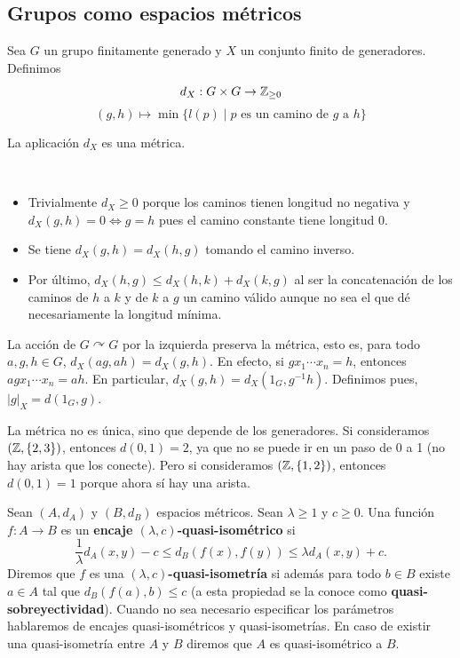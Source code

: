 \documentclass[twoside, 11pt]{article}
\begin{document}
\subsection{Grupos como espacios métricos}

Sea $G$ un grupo finitamente generado y $X$ un conjunto finito de generadores. Definimos
\[
d_X:G\times G\to\mathbb{Z}_{\geq 0}
\]
\[
(g,h)\mapsto\min\{l(p)\mid p\text{ es un camino de }g\text{ a }h\}
\]
\begin{prop}
La aplicación $d_X$ es una métrica.
\end{prop}
\begin{dem}\
\begin{itemize}
\item Trivialmente $d_X\geq 0$ porque los caminos tienen longitud no negativa y $d_X(g,h)=0\Leftrightarrow g=h$ pues el camino constante tiene longitud 0.
\item Se tiene $d_X(g,h)=d_X(h,g)$ tomando el camino inverso.
\item Por último, $d_X(h,g)\leq d_X(h,k)+d_X(k,g)$ al ser la concatenación de los caminos de $h$ a $k$ y de $k$ a $g$ un camino válido aunque no sea el que dé necesariamente la longitud mínima. 
\end{itemize}
\QED
\end{dem}

La acción de $G \curvearrowright G$ por la izquierda preserva la métrica, esto es, para todo $a,g,h\in G$, $d_X(ag,ah)=d_X(g,h)$. En efecto, si $gx_1\cdots x_n=h$, entonces $agx_1\cdots x_n=ah$. En particular, $d_X(g,h)=d_X(1_G,g^{-1}h)$. Definimos pues, $|g|_X=d(1_G,g)$. 

\begin{observacion}
La métrica no es única, sino que depende de los generadores. Si consideramos $(\mathbb{Z},\{2,3\})$, entonces $d(0,1)=2$, ya que no se puede ir en un paso de 0 a 1 (no hay arista que los conecte). Pero si consideramos $(\mathbb{Z},\{1,2\})$, entonces $d(0,1)=1$ porque ahora sí hay una arista. 
\end{observacion}

\begin{defi}
Sean $(A,d_A)$ y $(B,d_B)$ espacios métricos. Sean $\lambda\geq 1$ y $c\geq 0$. Una función $f:A\to B$ es un \textbf{encaje $(\lambda,c)$-quasi-isométrico} si
\[
\frac{1}{\lambda}d_A(x,y)-c\leq d_B(f(x),f(y))\leq \lambda d_A(x,y)+c.
\]
Diremos que $f$ es una \textbf{$(\lambda,c)$-quasi-isometría} si además para todo $b\in B$ existe $a\in A$ tal que $d_B(f(a),b)\leq c$ (a esta propiedad se la conoce como \textbf{quasi-sobreyectividad}). Cuando no sea necesario especificar los parámetros hablaremos de encajes quasi-isométricos y quasi-isometrías. En caso de existir una quasi-isometría entre $A$ y $B$ diremos que $A$ es quasi-isométrico a $B$.
\end{defi}
\end{document}
